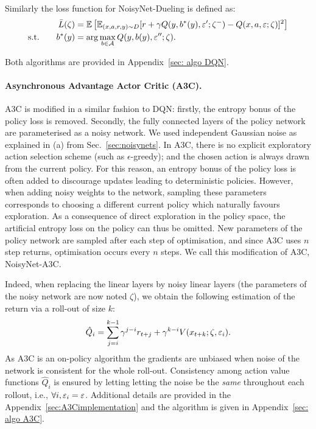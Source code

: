 \documentclass{article}
\newcommand{\algoinit}{NoisyNet}
\begin{document}
Similarly the loss function for \algoinit{}-Dueling is defined as:
 \begin{align}
 \bar L(\zeta)&=\mathbb{E}\left[\mathbb{E}_{(x,a,r,y)\sim D}[r+ \gamma Q(y,b^*(y),\varepsilon';\zeta^-)-Q(x,a,\varepsilon;\zeta)]^2\right]
 \\
 \text{s.t.}\qquad b^*(y)&=\arg\max_{b\in\mathcal A}Q(y,b(y),\varepsilon'';\zeta).
 \end{align}
 
 Both algorithms are provided in Appendix~\ref{sec: algo DQN}.


\paragraph{Asynchronous Advantage Actor Critic (A3C).}
A3C is modified in a similar fashion to DQN: firstly, the entropy bonus of the policy loss is removed.
Secondly, the fully connected layers of the policy network are parameterised as a noisy network. We used independent Gaussian noise as explained in (a) from Sec.~\ref{sec:noisynets}.
In A3C, there is no explicit exploratory action selection scheme (such as $\epsilon$-greedy); and the chosen action is always drawn from the current policy. For this reason, an entropy bonus of the policy loss is often added to discourage updates leading to deterministic policies. However, when adding noisy weights to the network, sampling these parameters corresponds to choosing a different current policy which naturally favours exploration.
As a consequence of direct exploration in the policy space, the artificial entropy loss on the policy can thus be omitted. New parameters of the policy network are sampled after each step of optimisation, and since A3C uses $n$ step returns, optimisation occurs every $n$ steps. We call this modification of A3C, \algoinit{}-A3C.


Indeed, when replacing the linear layers by noisy linear layers (the parameters of the noisy network are now noted $\zeta$), we obtain the following estimation of the return via a roll-out of size $k$:
\begin{equation}
\hat{Q}_i=\sum_{j=i}^{k-1}\gamma^{j-i}r_{t+j}+\gamma^{k-i}V(x_{t+k};\zeta,\varepsilon_i).
\end{equation}
As A3C is an on-policy algorithm the gradients are unbiased when noise of the network is consistent for the whole roll-out.
Consistency among action value functions $\hat{Q}_i$ is ensured by letting letting the noise be the \emph{same} throughout each rollout, i.e., $\forall i, \varepsilon_i=\varepsilon$.
Additional details are provided in the Appendix~\ref{sec:A3Cimplementation} and the algorithm is given in Appendix~\ref{sec: algo A3C}.
\end{document}
